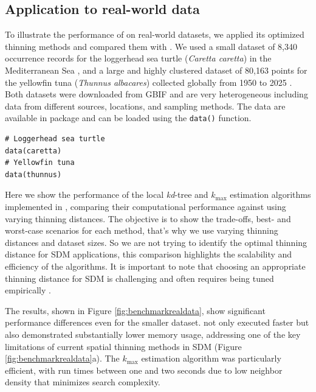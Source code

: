 \subsection{Application to real-world data}\label{benchreal}

To illustrate the performance of  on real-world datasets, we applied its optimized thinning methods and compared them with . We used a small dataset of 8,340 occurrence records for the loggerhead sea turtle (\emph{Caretta caretta}) in the Mediterranean Sea \citep{GBIFCaretta}, and a large and highly clustered dataset of 80,163 points for the yellowfin tuna (\emph{Thunnus albacares}) collected globally from 1950 to 2025 \citep{GBIFThunnus}. Both datasets were downloaded from GBIF \citep{GBIF} and are very heterogeneous including data from different sources, locations, and sampling methods. The data are available in  package and can be loaded using the \texttt{data()} function.

\begin{verbatim}
# Loggerhead sea turtle
data(caretta)
# Yellowfin tuna
data(thunnus)
\end{verbatim}

Here we show the performance of the local \emph{kd}-tree and \(k_\text{max}\) estimation algorithms implemented in , comparing their computational performance against  using varying thinning distances. The objective is to show the trade-offs, best- and worst-case scenarios for each method, that's why we use varying thinning distances and dataset sizes. So we are not trying to identify the optimal thinning distance for SDM applications, this comparison highlights the scalability and efficiency of the algorithms. It is important to note that choosing an appropriate thinning distance for SDM is challenging and often requires being tuned empirically \citep{veloz2009spatially, soley2019sufficient}.

The results, shown in Figure \ref{fig:benchmarkrealdata}, show significant performance differences even for the smaller dataset.  not only executed faster but also demonstrated substantially lower memory usage, addressing one of the key limitations of current spatial thinning methods in SDM (Figure \ref{fig:benchmarkrealdata}a). The \(k_\text{max}\) estimation algorithm was particularly efficient, with run times between one and two seconds due to low neighbor density that minimizes search complexity.

